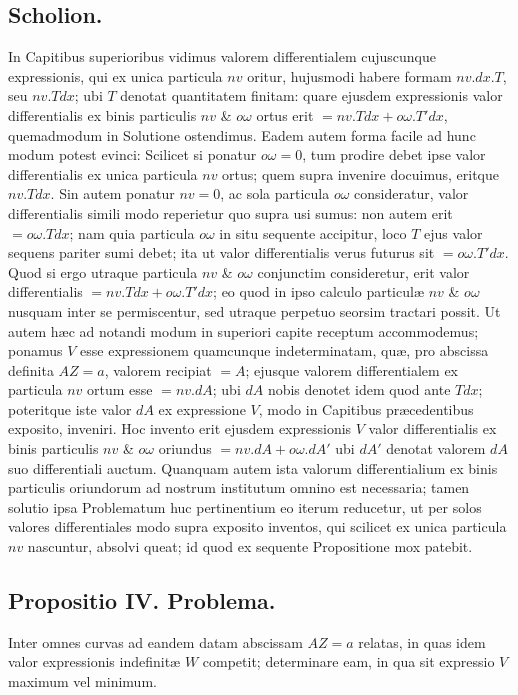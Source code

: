\subsection*{Scholion.}
In Capitibus superioribus vidimus valorem differentialem cujuscunque expressionis, qui ex unica particula $nv$ oritur, hujusmodi habere formam $nv.dx.T$, seu $nv.Tdx$; ubi $T$ denotat quantitatem finitam: quare ejusdem expressionis valor differentialis ex binis particulis $nv$ \& $o\omega$ ortus erit $=nv.Tdx+o\omega.T'dx$, quemadmodum in Solutione ostendimus. Eadem autem forma facile ad hunc modum potest evinci: Scilicet si ponatur $o\omega=0$, tum prodire debet ipse valor differentialis ex unica particula $nv$ ortus; quem supra invenire docuimus, eritque $nv.Tdx$. Sin autem ponatur $nv=0$, ac sola particula $o\omega$ consideratur, valor differentialis simili modo reperietur quo supra usi sumus: non autem erit $=o\omega.Tdx$; nam quia particula $o\omega$ in situ sequente accipitur, loco $T$ ejus valor sequens pariter sumi debet; ita ut valor differentialis verus futurus sit $=o\omega.T'dx$. Quod si ergo utraque particula $nv$ \& $o\omega$ conjunctim consideretur, erit valor differentialis $=nv.Tdx+o\omega.T'dx$; eo quod in ipso calculo particulæ $nv$ \& $o\omega$ nusquam inter se permiscentur, sed utraque perpetuo seorsim tractari possit. Ut autem hæc ad notandi modum in superiori capite receptum accommodemus; ponamus $V$ esse expressionem quamcunque indeterminatam, quæ, pro abscissa definita $AZ=a$, valorem recipiat $=A$; ejusque valorem differentialem ex particula $nv$ ortum esse $=nv.dA$; ubi $dA$ nobis denotet idem quod ante $Tdx$; poteritque iste valor $dA$ ex expressione $V$, modo in Capitibus præcedentibus exposito, inveniri. Hoc invento erit ejusdem expressionis $V$ valor differentialis ex binis particulis $nv$ \& $o\omega$ oriundus $=nv.dA+o\omega.dA'$ ubi $dA'$ denotat valorem $dA$ suo differentiali auctum. Quanquam autem ista valorum differentialium ex binis particulis oriundorum ad nostrum institutum omnino est necessaria; tamen solutio ipsa Problematum huc pertinentium eo iterum reducetur, ut per solos valores differentiales modo supra exposito inventos, qui scilicet ex unica particula $nv$ nascuntur, absolvi queat; id quod ex sequente Propositione mox patebit.

\subsection*{Propositio IV. Problema.}
Inter omnes curvas ad eandem datam abscissam $AZ=a$ relatas, in quas idem valor expressionis indefinitæ $W$ competit; determinare eam, in qua sit expressio $V$ maximum vel minimum.

